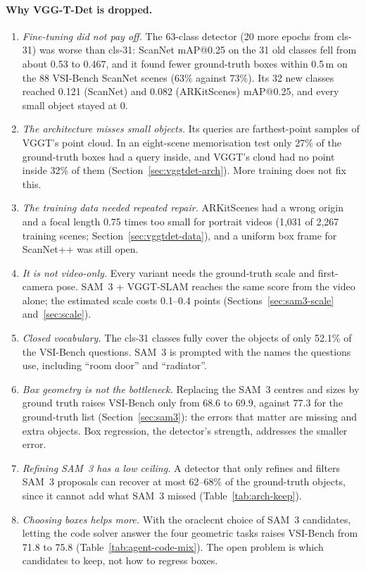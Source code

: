 \paragraph{Why VGG-T-Det is dropped.}
\begin{enumerate}
\item \emph{Fine-tuning did not pay off.} The 63-class detector (20 more epochs from cls-31) was worse than cls-31:
  ScanNet mAP@0.25 on the 31 old classes fell from about 0.53 to 0.467, and it found fewer ground-truth boxes within
  0.5\,m on the 88 VSI-Bench ScanNet scenes (63\% against 73\%). Its 32 new classes reached 0.121 (ScanNet) and 0.082
  (ARKitScenes) mAP@0.25, and every small object stayed at 0.
\item \emph{The architecture misses small objects.} Its queries are farthest-point samples of VGGT's point cloud. In an
  eight-scene memorisation test only 27\% of the ground-truth boxes had a query inside, and VGGT's cloud had no point
  inside 32\% of them (Section~\ref{sec:vggtdet-arch}). More training does not fix this.
\item \emph{The training data needed repeated repair.} ARKitScenes had a wrong origin and a focal length 0.75 times too
  small for portrait videos (1,031 of 2,267 training scenes; Section~\ref{sec:vggtdet-data}), and a uniform box frame for
  ScanNet++ was still open.
\item \emph{It is not video-only.} Every variant needs the ground-truth scale and first-camera pose. SAM~3 + VGGT-SLAM
  reaches the same score from the video alone; the estimated scale costs 0.1--0.4 points
  (Sections~\ref{sec:sam3-scale} and~\ref{sec:scale}).
\item \emph{Closed vocabulary.} The cls-31 classes fully cover the objects of only 52.1\% of the VSI-Bench questions.
  SAM~3 is prompted with the names the questions use, including ``room door'' and ``radiator''.
\item \emph{Box geometry is not the bottleneck.} Replacing the SAM~3 centres and sizes by ground truth raises VSI-Bench
  only from 68.6 to 69.9, against 77.3 for the ground-truth list (Section~\ref{sec:sam3}): the errors that matter are
  missing and extra objects. Box regression, the detector's strength, addresses the smaller error.
\item \emph{Refining SAM~3 has a low ceiling.} A detector that only refines and filters SAM~3 proposals can recover at
  most 62--68\% of the ground-truth objects, since it cannot add what SAM~3 missed (Table~\ref{tab:arch-keep}).
\item \emph{Choosing boxes helps more.} With the oraclecnt choice of SAM~3 candidates, letting the code solver answer the
  four geometric tasks raises VSI-Bench from 71.8 to 75.8 (Table~\ref{tab:agent-code-mix}). The open problem is which
  candidates to keep, not how to regress boxes.
\end{enumerate}

